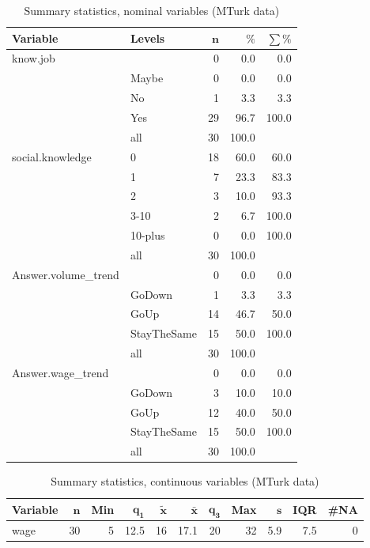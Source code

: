 \documentclass[a4paper,10pt]{article}\usepackage[]{graphicx}\usepackage[]{color}
\begin{document}
\begin{table}[ht]
\centering
{\footnotesize
\begin{tabular}{ll|rrr}
 \textbf{Variable} & \textbf{Levels} & $\mathbf{n}$ & $\mathbf{\%}$ & $\mathbf{\sum \%}$ \\ 
  \hline
know.job &  & 0 & 0.0 & 0.0 \\ 
   & Maybe & 0 & 0.0 & 0.0 \\ 
   & No & 1 & 3.3 & 3.3 \\ 
   & Yes & 29 & 96.7 & 100.0 \\ 
   \hline
 & all & 30 & 100.0 &  \\ 
   \hline
\hline
social.knowledge & 0 & 18 & 60.0 & 60.0 \\ 
   & 1 & 7 & 23.3 & 83.3 \\ 
   & 2 & 3 & 10.0 & 93.3 \\ 
   & 3-10 & 2 & 6.7 & 100.0 \\ 
   & 10-plus & 0 & 0.0 & 100.0 \\ 
   \hline
 & all & 30 & 100.0 &  \\ 
   \hline
\hline
Answer.volume\_trend &  & 0 & 0.0 & 0.0 \\ 
   & GoDown & 1 & 3.3 & 3.3 \\ 
   & GoUp & 14 & 46.7 & 50.0 \\ 
   & StayTheSame & 15 & 50.0 & 100.0 \\ 
   \hline
 & all & 30 & 100.0 &  \\ 
   \hline
\hline
Answer.wage\_trend &  & 0 & 0.0 & 0.0 \\ 
   & GoDown & 3 & 10.0 & 10.0 \\ 
   & GoUp & 12 & 40.0 & 50.0 \\ 
   & StayTheSame & 15 & 50.0 & 100.0 \\ 
   \hline
 & all & 30 & 100.0 &  \\ 
   \hline
\hline
\end{tabular}
}
\caption{Summary statistics, nominal variables (MTurk data)} 
\label{tab1:21-1020}
\end{table}
\begin{table}[ht]
\centering
{\footnotesize
\begin{tabular}{lrrrrrrrrrr}
 \textbf{Variable} & $\mathbf{n}$ & \textbf{Min} & $\mathbf{q_1}$ & $\mathbf{\widetilde{x}}$ & $\mathbf{\bar{x}}$ & $\mathbf{q_3}$ & \textbf{Max} & $\mathbf{s}$ & \textbf{IQR} & \textbf{\#NA} \\ 
  \hline
wage & 30 & 5 & 12.5 & 16 & 17.1 & 20 & 32 & 5.9 & 7.5 & 0 \\ 
  \end{tabular}
}
\caption{Summary statistics, continuous variables (MTurk data)} 
\label{tab2:21-1020}
\end{table}
\end{document}
